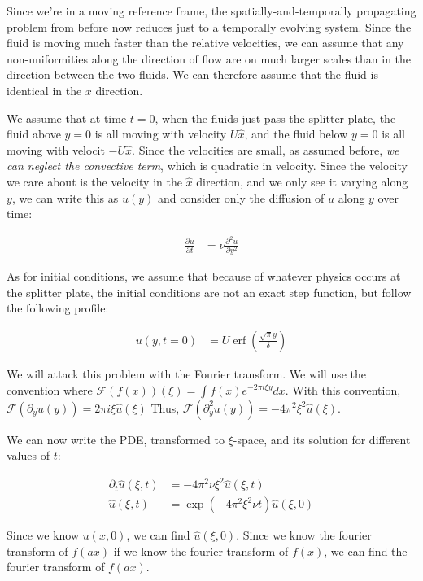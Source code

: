 \documentclass{article}
\DeclareMathOperator\erf{erf}
\begin{document}
Since we're in a moving reference frame, the spatially-and-temporally
	propagating problem from before now reduces just to a temporally
	evolving system.
Since the fluid is moving much faster than the relative velocities,
	we can assume that any non-uniformities along the direction
	of flow are on much larger scales than in the direction
	between the two fluids.
We can therefore assume that the fluid is identical in the $x$ 
	direction.

We assume that at time $t=0$, when the fluids just pass the splitter-plate,
	the fluid above $y=0$ is all moving with velocity $U \hat{x}$,
	and the fluid below $y=0$ is all moving with velocit $-U \hat{x}$.
Since the velocities are small, as assumed before, \emph{we can neglect the
	convective term}, which is quadratic in velocity.
Since the velocity we care about is the velocity in the $\hat{x}$ direction,
	and we only see it varying along $y$, we can write this as 
	$u(y)$ and consider only the diffusion of $u$ along $y$ over time:

\begin{align}
\frac{\partial u}{\partial t} & = \nu \frac{\partial^2 u}{\partial y^2}
\end{align}

As for initial conditions, we assume that because of whatever physics
	occurs at the splitter plate, the initial conditions are
	not an exact step function, but follow the following 
	profile:

\begin{align}
u(y,t=0) & = U \erf \left( \frac{ \sqrt{\pi} y}{\delta } \right)
\end{align}

We will attack this problem with the Fourier transform.
We will use the convention where $\mathcal{F}(f(x))(\xi) =
	 \int f(x) e^{-2 \pi i \xi y} dx$.
With this convention, $\mathcal{F} \left(\partial_y u(y)\right) 
	= 2\pi i \xi \hat{u}(\xi)$
Thus, $\mathcal{F} \left(\partial_y^2 u(y)\right) 
	= - 4 \pi^2 \xi^2 \hat{u}(\xi)$.

We can now write the PDE, transformed to $\xi$-space, and its solution
	for different values of $t$:

\begin{align}
\partial_t \hat{u}(\xi, t) & = - 4 \pi^2 \nu \xi^2 \hat{u}(\xi, t) \\
\hat{u}(\xi, t) & = \exp \left( - 4 \pi^2 \xi^2 \nu t \right) \hat{u}(\xi, 0)
\end{align}

Since we know $u(x,0)$, we can find $\hat{u}(\xi, 0)$.
Since we know the fourier transform of $f(a x)$ if we know the
	fourier transform of $f(x)$, we can find the fourier
	transform of $f(a x)$. 
\end{document}
